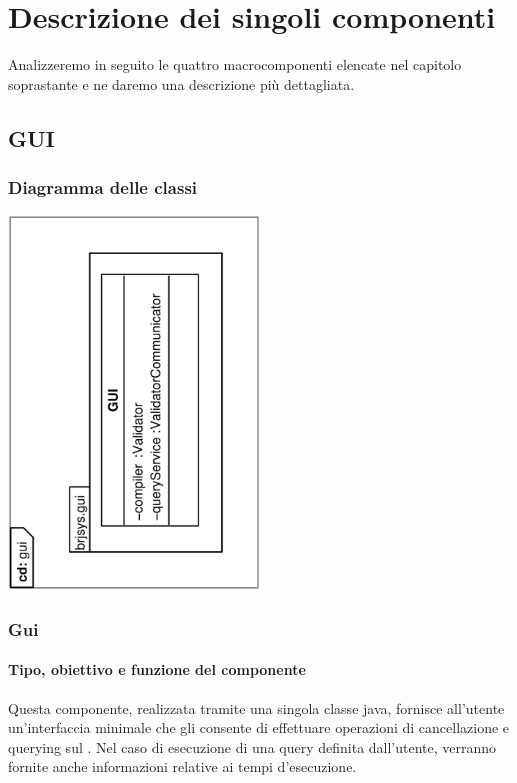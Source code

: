 \documentclass[11pt,titlepage,a4paper]{report}
\begin{document}
\chapter{Descrizione dei singoli componenti}
Analizzeremo in seguito le quattro macrocomponenti elencate nel capitolo soprastante e ne daremo una descrizione pi\`u dettagliata.

\section{GUI}
\subsection{Diagramma delle classi}
\begin{center}
\includegraphics[width=0.5\textwidth, angle=-90]{DiagrammaClassi/gui.eps}
\end{center}
\subsection{Gui}
\subsubsection{Tipo, obiettivo e funzione del componente}
Questa componente, realizzata tramite una singola classe java, fornisce all'utente un'interfaccia minimale che gli consente di effettuare operazioni di cancellazione e querying sul \re. Nel caso di esecuzione di una query definita dall'utente, verranno fornite anche informazioni relative ai tempi d'esecuzione.
\end{document}
